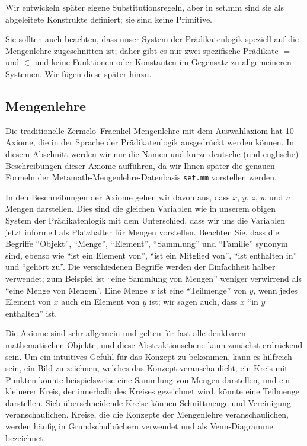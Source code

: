 Wir entwickeln später eigene Substitutionsregeln, aber in set.mm sind sie als abgeleitete Konstrukte definiert; sie sind keine Primitive.

Sie sollten auch beachten, dass unser System der Prädikatenlogik speziell auf die Mengenlehre zugeschnitten ist; daher gibt es nur zwei spezifische Prädikate $=$ und $\in$ und keine Funktionen oder Konstanten im Gegensatz zu allgemeineren Systemen. Wir fügen diese später hinzu.

\subsection{Mengenlehre}

Die traditionelle Zermelo--Fraenkel-Mengenlehre mit dem Auswahlaxiom hat 10 Axiome, die in der Sprache der Prädikatenlogik ausgedrückt werden können.  In diesem Abschnitt werden wir nur die Namen und kurze deutsche (und englische) Beschreibungen dieser Axiome aufführen, da wir Ihnen später die genauen Formeln der Metamath-Mengenlehre-Datenbasis \texttt{set.mm} vorstellen werden.

In den Beschreibungen der Axiome gehen wir davon aus, dass $x$, $y$, $z$, $w$ und $v$ Mengen darstellen.  Dies sind die gleichen Variablen wie in unserem obigen System der Prädikatenlogik mit dem Unterschied, dass wir uns die Variablen jetzt informell als Platzhalter für Mengen vorstellen.  Beachten Sie, dass die Begriffe "`Objekt"', "`Menge"', "`Element"', "`Sammlung"' und "`Familie"' synonym sind, ebenso wie "`ist ein Element von"', "`ist ein Mitglied von"', "`ist enthalten in"' und "`gehört zu"'.  Die verschiedenen Begriffe werden der Einfachheit halber verwendet; zum Beispiel ist "`eine Sammlung von Mengen"' weniger verwirrend als "`eine Menge von Mengen"'. Eine Menge $x$ ist eine "`Teilmenge"' von $y$, wenn jedes Element von $x$ auch ein Element von $y$ ist; wir sagen auch, dass $x$ "`in $y$ enthalten"' ist.

Die Axiome sind sehr allgemein und gelten für fast alle denkbaren mathematischen Objekte, und diese Abstraktionsebene kann zunächst erdrückend sein.  Um ein intuitives Gefühl für das Konzept zu bekommen, kann es hilfreich sein, ein Bild zu zeichnen, welches das Konzept veranschaulicht; ein Kreis mit Punkten könnte beispielsweise eine Sammlung von Mengen darstellen, und ein kleinerer Kreis, der innerhalb des Kreises gezeichnet wird, könnte eine Teilmenge darstellen. Sich überschneidende Kreise können Schnittmenge und Vereinigung veranschaulichen.  Kreise, die die Konzepte der Mengenlehre veranschaulichen, werden häufig in Grundschulbüchern verwendet und als Venn-Diagramme bezeichnet.

